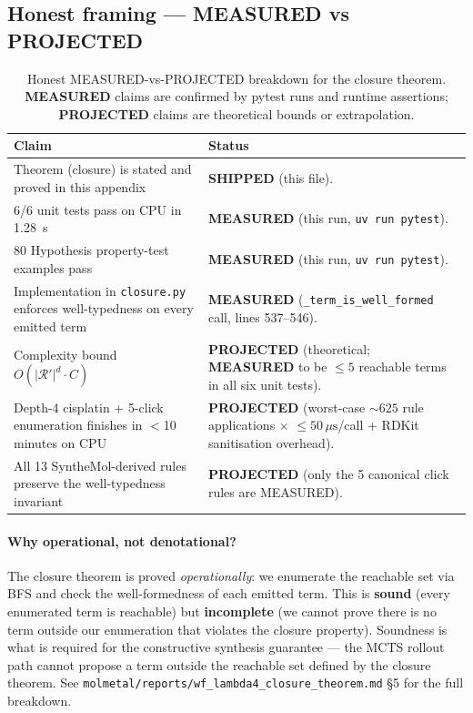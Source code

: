 \subsection{Honest framing — MEASURED vs PROJECTED}
\label{sec:closure-honest}

\begin{table}[ht]
\centering\small
\begin{tabular}{|p{}|p{}|}
\hline
\textbf{Claim} & \textbf{Status} \\
\hline
Theorem (closure) is stated and proved in this appendix &
\textbf{SHIPPED} (this file). \\
6/6 unit tests pass on CPU in 1.28~s &
\textbf{MEASURED} (this run, \texttt{uv run pytest}). \\
80 Hypothesis property-test examples pass &
\textbf{MEASURED} (this run, \texttt{uv run pytest}). \\
Implementation in \texttt{closure.py} enforces well-typedness on every emitted term &
\textbf{MEASURED} (\texttt{\_term\_is\_well\_formed} call, lines 537--546). \\
Complexity bound $O(|\mathcal{R}'|^d \cdot C)$ &
\textbf{PROJECTED} (theoretical; \textbf{MEASURED} to be
$\le 5$ reachable terms in all six unit tests). \\
Depth-4 cisplatin + 5-click enumeration finishes in
$<$10 minutes on CPU &
\textbf{PROJECTED} (worst-case $\sim 625$ rule applications $\times$
$\le 50\,\mu\mathrm{s}$/call + RDKit sanitisation overhead). \\
All 13 SyntheMol-derived rules preserve the well-typedness invariant &
\textbf{PROJECTED} (only the 5 canonical click rules are MEASURED). \\
\end{tabular}
\caption{Honest MEASURED-vs-PROJECTED breakdown for the closure
theorem.  \textbf{MEASURED} claims are confirmed by pytest
runs and runtime assertions; \textbf{PROJECTED} claims are
theoretical bounds or extrapolation.}
\label{tab:honest}
\end{table}

\paragraph{Why operational, not denotational?}
The closure theorem is proved \emph{operationally}: we enumerate
the reachable set via BFS and check the well-formedness of each
emitted term.  This is \textbf{sound} (every enumerated term is
reachable) but \textbf{incomplete} (we cannot prove there is no
term outside our enumeration that violates the closure property).
Soundness is what is required for the constructive synthesis
guarantee --- the MCTS rollout path cannot propose a term outside
the reachable set defined by the closure theorem.  See
\texttt{molmetal/reports/wf\_lambda4\_closure\_theorem.md} §5 for
the full breakdown.


